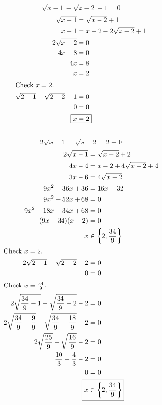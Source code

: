 	\subsection{}
		\[\sqrt{x - 1} - \sqrt{x - 2} - 1 = 0\]
		\begin{align*}
			\sqrt{x - 1} &= \sqrt{x - 2} + 1 \\
			x - 1 &= x - 2 - 2\sqrt{x - 2} + 1 \\
			2\sqrt{x - 2} &= 0 \\
			4x - 8 &= 0 \\
			4x &= 8 \\
			x &= 2 \\
			\intertext{Check $x = 2$.}
			\sqrt{2 - 1} - \sqrt{2 - 2} - 1 &= 0 \\
			0 &= 0 \\
			\Aboxed{x &= 2}
		\end{align*}
		\pagebreak{}

	\subsection{}
		\[2\sqrt{x - 1} - \sqrt{x - 2} - 2 = 0\]
		\begin{align*}
			2\sqrt{x - 1} &= \sqrt{x - 2} + 2 \\
			4x - 4 &= x - 2 + 4\sqrt{x - 2} + 4 \\
			3x - 6 &= 4\sqrt{x - 2} \\
			9x^2 - 36x + 36 &= 16x - 32 \\
			9x^2 - 52x + 68 &= 0 \\
			9x^2 - 18x - 34x + 68 &= 0 \\
			(9x - 34)(x - 2) &= 0 \\
			x &\in \left\{2, \frac{34}{9}\right\} \\
			\intertext{Check $x = 2$.}
			2\sqrt{2 - 1} - \sqrt{2 - 2} - 2 &= 0 \\
			0 &= 0 \\
			\intertext{Check $x = \frac{34}{9}$.}
			2\sqrt{\frac{34}{9} - 1} - \sqrt{\frac{34}{9} - 2} - 2 &= 0 \\
			2\sqrt{\frac{34}{9} - \frac{9}{9}} - \sqrt{\frac{34}{9} - \frac{18}{9}} - 2 &= 0 \\
			2\sqrt{\frac{25}{9}} - \sqrt{\frac{16}{9}} - 2 &= 0 \\
			\frac{10}{3} - \frac{4}{3} - 2 &= 0 \\
			0 &= 0 \\
			\Aboxed{x &\in \left\{2, \frac{34}{9}\right\}}
		\end{align*}
		\pagebreak{}

